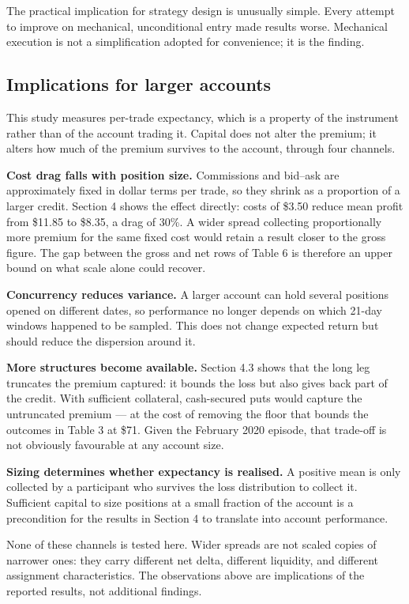 \documentclass[11pt,a4paper]{article}
\begin{document}
The practical implication for strategy design is unusually simple. Every attempt to improve on mechanical,
unconditional entry made results worse. Mechanical execution is not a simplification adopted for
convenience; it is the finding.

\subsection{Implications for larger accounts}

This study measures per-trade expectancy, which is a property of the instrument rather than of the
account trading it. Capital does not alter the premium; it alters how much of the premium survives to
the account, through four channels.

\textbf{Cost drag falls with position size.} Commissions and bid--ask are approximately fixed in dollar
terms per trade, so they shrink as a proportion of a larger credit. Section 4 shows the effect
directly: costs of \$3.50 reduce mean profit from \$11.85 to \$8.35, a drag of 30\%. A wider spread
collecting proportionally more premium for the same fixed cost would retain a result closer to the
gross figure. The gap between the gross and net rows of Table 6 is therefore an upper bound on what
scale alone could recover.

\textbf{Concurrency reduces variance.} A larger account can hold several positions opened on different
dates, so performance no longer depends on which 21-day windows happened to be sampled. This does not
change expected return but should reduce the dispersion around it.

\textbf{More structures become available.} Section 4.3 shows that the long leg truncates the premium
captured: it bounds the loss but also gives back part of the credit. With sufficient collateral,
cash-secured puts would capture the untruncated premium --- at the cost of removing the floor that
bounds the outcomes in Table 3 at \$71. Given the February 2020 episode, that trade-off is not
obviously favourable at any account size.

\textbf{Sizing determines whether expectancy is realised.} A positive mean is only collected by a
participant who survives the loss distribution to collect it. Sufficient capital to size positions at a
small fraction of the account is a precondition for the results in Section 4 to translate into account
performance.

None of these channels is tested here. Wider spreads are not scaled copies of narrower ones: they carry
different net delta, different liquidity, and different assignment characteristics. The observations
above are implications of the reported results, not additional findings.
\end{document}
